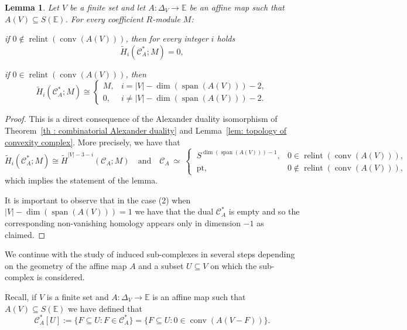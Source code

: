 \documentclass[a4paper,11pt,reqno, english]{amsart}
\newtheorem{lemma}[theorem]{Lemma}
\theoremstyle{definition}
\theoremstyle{remark}
\newcommand\CC{\mathscr C}
\newcommand\E{\mathbb{E}}
\newcommand\pt{\mathrm{pt}}
\DeclareMathOperator{\spann}{\mathrm{span}}
\DeclareMathOperator{\relint}{\mathrm{relint}}
\DeclareMathOperator{\conv}{\mathrm{conv}}
\begin{document}
\begin{lemma}
	\label{lem : topology of dual of complexity complex}
	Let $V$ be a finite set and let $A\colon \Delta_V\longrightarrow\E$ be an affine map such that $A(V)\subseteq S(\E)$.
	For every coefficient $R$-module $M$:
	\begin{compactenum}[\quad \rm (1)]
		\item if $0\notin  \relint (\conv (A(V)))$, then for every integer $i$ holds
		\[	 \widetilde{H}_i(\CC_{A}^*;M) =  0,
		\]
		\item if $0\in  \relint (\conv (A(V)))$, then
		\[
			\widetilde{H}_i(\CC_{A}^*;M) \cong
			\begin{cases}
				M, & i= |V|-\dim (\spann(A(V)))-2 ,    \\
				0, & i\neq |V|-\dim (\spann(A(V)))-2 .
			\end{cases}
		\]
	\end{compactenum}
\end{lemma}
\begin{proof}
	This is a direct consequence of the Alexander duality isomorphism of Theorem~\ref{th : combinatorial Alexander duality} and Lemma~\ref{lem: topology of convexity complex}.
	More precisely, we have that
	\[
		\widetilde{H}_i(\CC_A^*;M)\cong   \widetilde{H}^{|V|-3-i}(\CC_A;M)
		\quad\text{and}\quad
		\CC_A \ \simeq \
		\begin{cases}
			\  S^{\dim(\spann(A(V)))-1} , & 0\in \relint (\conv (A(V))),     \\
			\   \pt,                      & 0\notin  \relint (\conv (A(V))),
		\end{cases}
	\]
	which implies the statement of the lemma.

	\medskip
	It is important to observe that in the case (2) when $|V|-\dim(\spann(A(V)))=1$ we have that the dual  $\CC_A^*$ is empty and so the corresponding non-vanishing homology appears only in dimension $-1$ as claimed.
\end{proof}


\medskip
We continue with the study of induced sub-complexes in several steps depending on the geometry of the affine map $A$ and a subset $U\subseteq V$ on which the sub-complex is considered.

\medskip
Recall, if $V$ is a finite set and $A\colon \Delta_V\longrightarrow\E$ is an affine map such that $A(V)\subseteq S(\E)$ we have defined that
\begin{equation}\label{eq : definition of CC_V^*[U]}
	\CC_A^*[U]:=\{F\subseteq U : F\in \CC_A^*\}=\{F\subseteq U : 0\in \conv(A(V-F)) \}.
\end{equation}
\end{document}
